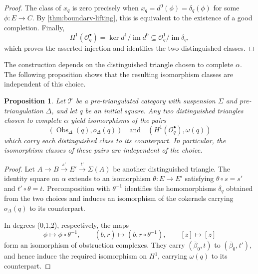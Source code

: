 \documentclass[a4paper,11pt,reqno]{amsart}
\newtheorem{proposition}[proposition]{Proposition}
\theoremstyle{definition}
\theoremstyle{plain}
\numberwithin{equation}{section}
\newcommand{\T}{\mathcal T}
\newcommand{\xto}[1]{\xrightarrow{#1}}
\begin{document}
\begin{proof}
The class of $x_q$ is zero precisely when
$x_q=d^0(\phi)=\delta_q(\phi)$ for some $\phi:E\to C$.  By
\cref{thm:boundary-lifting}, this is equivalent to the existence of a good
completion.  Finally,
\[
 H^1(\mathcal O_q^\bullet)
   =\ker d^1/\operatorname{im}d^0
   \subseteq \mathcal O_q^1/\operatorname{im}\delta_q,
\]
which proves the asserted injection and identifies the two distinguished
classes.
\end{proof}

The construction depends on the distinguished triangle chosen to complete
$\alpha$.  The following proposition shows that the resulting isomorphism
classes are independent of this choice.

\begin{proposition}
\label{prop:local-choice-independence}
Let \(\T\) be a pre-triangulated category with suspension \(\Sigma\) and
pre-triangulation \(\Delta\), and let \(q\) be an initial square.  Any two
distinguished triangles chosen to complete
$\alpha$ yield isomorphisms of the pairs
\[
 (\operatorname{Obs}_\Delta(q),o_\Delta(q))
 \quad\text{and}\quad
 (H^1(\mathcal O_q^\bullet),\omega(q))
\]
which carry each distinguished class to its counterpart.  In particular,
the isomorphism classes of these pairs are independent of the choice.
\end{proposition}

\begin{proof}
Let $A\to B\xto{s'}E'\xto{t'}\Sigma(A)$ be another distinguished triangle.
The identity square on $\alpha$ extends to an isomorphism
$\theta:E\to E'$ satisfying $\theta\circ s=s'$ and $t'\circ\theta=t$.
Precomposition with $\theta^{-1}$ identifies the homomorphisms $\delta_q$
obtained from the two choices and
induces an isomorphism of the cokernels carrying $o_\Delta(q)$ to its
counterpart.

In degrees (0,1,2), respectively, the maps
\[
 \phi\longmapsto\phi\circ\theta^{-1},\qquad
 (\bar b,r)\longmapsto(\bar b,r\circ\theta^{-1}),\qquad
 [z]\longmapsto[z]
\]
form an isomorphism of obstruction complexes.  They carry
$(\bar\beta_0,t)$ to $(\bar\beta_0,t')$, and hence induce the required
isomorphism on $H^1$, carrying $\omega(q)$ to its counterpart.
\end{proof}
\end{document}
